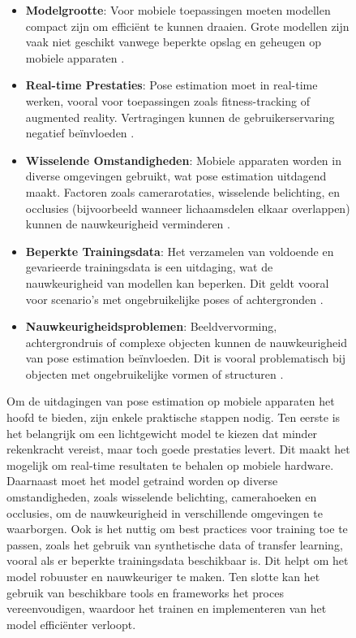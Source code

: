 \begin{figure}[h]
\begin{itemize}
    \item \textbf{Modelgrootte}: 
    Voor mobiele toepassingen moeten modellen compact zijn om efficiënt te kunnen draaien. Grote modellen zijn vaak niet geschikt vanwege beperkte opslag en geheugen op mobiele apparaten \autocite{HouEtAl2020}.

    \item \textbf{Real-time Prestaties}: 
    Pose estimation moet in real-time werken, vooral voor toepassingen zoals fitness-tracking of augmented reality. Vertragingen kunnen de gebruikerservaring negatief beïnvloeden \autocite{HouEtAl2020}.

    \item \textbf{Wisselende Omstandigheden}: 
    Mobiele apparaten worden in diverse omgevingen gebruikt, wat pose estimation uitdagend maakt. Factoren zoals camerarotaties, wisselende belichting, en occlusies (bijvoorbeeld wanneer lichaamsdelen elkaar overlappen) kunnen de nauwkeurigheid verminderen \autocite{SulongEtAl2023}.

    \item \textbf{Beperkte Trainingsdata}: 
    Het verzamelen van voldoende en gevarieerde trainingsdata is een uitdaging, wat de nauwkeurigheid van modellen kan beperken. Dit geldt vooral voor scenario’s met ongebruikelijke poses of achtergronden \autocite{PauloEtAl2024}.

    \item \textbf{Nauwkeurigheidsproblemen}: 
    Beeldvervorming, achtergrondruis of complexe objecten kunnen de nauwkeurigheid van pose estimation beïnvloeden. Dit is vooral problematisch bij objecten met ongebruikelijke vormen of structuren \autocite{SulongEtAl2023}.
\end{itemize}

Om de uitdagingen van pose estimation op mobiele apparaten het hoofd te bieden, zijn enkele praktische stappen nodig. Ten eerste is het belangrijk om een lichtgewicht model te kiezen dat minder rekenkracht vereist, maar toch goede prestaties levert. Dit maakt het mogelijk om real-time resultaten te behalen op mobiele hardware. Daarnaast moet het model getraind worden op diverse omstandigheden, zoals wisselende belichting, camerahoeken en occlusies, om de nauwkeurigheid in verschillende omgevingen te waarborgen.
\medskip
Ook is het nuttig om best practices voor training toe te passen, zoals het gebruik van synthetische data of transfer learning, vooral als er beperkte trainingsdata beschikbaar is. Dit helpt om het model robuuster en nauwkeuriger te maken. Ten slotte kan het gebruik van beschikbare tools en frameworks het proces vereenvoudigen, waardoor het trainen en implementeren van het model efficiënter verloopt.



\end{figure}
